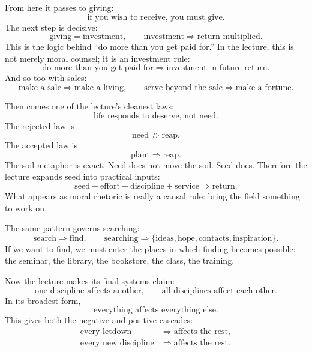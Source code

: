 From here it passes to giving:
\begin{equation}
\text{if you wish to receive, you must give}.
\end{equation}
The next step is decisive:
\begin{equation}
\text{giving}=\text{investment},
\qquad
\text{investment}\Rightarrow \text{return multiplied}.
\end{equation}
This is the logic behind ``do more than you get paid for.'' In the lecture, this is not merely moral counsel; it is an investment rule:
\begin{equation}
\text{do more than you get paid for} \Rightarrow \text{investment in future return}.
\end{equation}
And so too with sales:
\begin{equation}
\text{make a sale} \Rightarrow \text{make a living},
\qquad
\text{serve beyond the sale} \Rightarrow \text{make a fortune}.
\end{equation}

Then comes one of the lecture's cleanest laws:
\begin{equation}
\text{life responds to deserve, not need}.
\end{equation}
The rejected law is
\begin{equation}
\text{need} \not\Rightarrow \text{reap}.
\end{equation}
The accepted law is
\begin{equation}
\text{plant} \Rightarrow \text{reap}.
\end{equation}
The soil metaphor is exact. Need does not move the soil. Seed does. Therefore the lecture expands seed into practical inputs:
\begin{equation}
\text{seed}+\text{effort}+\text{discipline}+\text{service}\Rightarrow \text{return}.
\end{equation}
What appears as moral rhetoric is really a causal rule: bring the field something to work on.

The same pattern governs searching:
\begin{equation}
\text{search} \Rightarrow \text{find},
\qquad
\text{searching} \Rightarrow \{\text{ideas},\text{hope},\text{contacts},\text{inspiration}\}.
\end{equation}
If we want to find, we must enter the places in which finding becomes possible: the seminar, the library, the bookstore, the class, the training.

Now the lecture makes its final systems-claim:
\begin{equation}
\text{one discipline affects another},
\qquad
\text{all disciplines affect each other}.
\end{equation}
In its broadest form,
\begin{equation}
\text{everything affects everything else}.
\end{equation}
This gives both the negative and positive cascades:
\begin{align}
\text{every letdown} &\Rightarrow \text{affects the rest},\\
\text{every new discipline} &\Rightarrow \text{affects the rest}.
\end{align}

